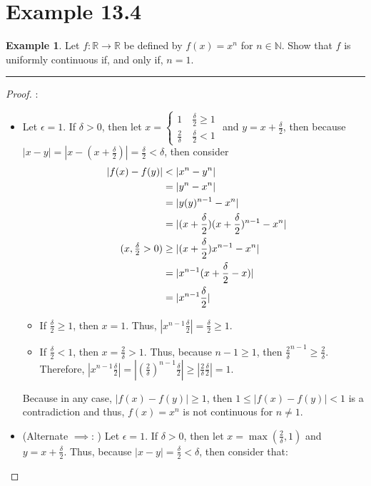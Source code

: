 \documentclass[openany, amssymb, psamsfonts]{amsart}
\newcommand{\bbN}{\mathbb{N}}
\newcommand{\bbR}{\mathbb{R}}
\theoremstyle{definition}
\newtheorem{exmp}{Example}[section]
\numberwithin{equation}{section}
\begin{document}
\section*{Example 13.4}
\begin{exmp}
\label{13.4}
	Let $f\colon \bbR \to \bbR$ be defined by $f(x) = x^n$ for $n \in \bbN$. Show that $f$ is uniformly continuous if, and only if, $n = 1$.
\end{exmp}
\vspace{4pt}     \hrule   \vspace{4pt} \begin{proof}:\\
\begin{itemize}
\item Let $\epsilon = 1$. If $\delta>0$, then let $x = \begin{cases}  1 \quad \frac{\delta}{2}\geq 1\\
\frac{2}{\delta} \quad \frac{\delta}{2} < 1
\end{cases}$ and $y= x + \frac{\delta}{2}$, then because $|x-y| = |x - (x + \frac{\delta}{2})| = \frac{\delta}{2}<\delta$, then consider 
\begin{align*}
|f(x) - f(y)| &< |x^n - y^n|\\
 &= |y^n - x^n|\\
 &= |y(y)^{n-1} - x^n|\\
 &= |(x+\frac{\delta}{2})(x+\frac{\delta}{2})^{n-1} - x^n| \\
\tag{$x,\frac{\delta}{2}>0$} &\geq|(x+\frac{\delta}{2})x^{n-1} - x^n|\\
&= |x^{n-1}(x+\frac{\delta}{2} - x)|\\
&= |x^{n-1}\frac{\delta}{2}|
\end{align*}
\begin{itemize}
    \item If $\frac{\delta}{2} \geq 1$, then $x = 1$. Thus, $|x^{n-1}\frac{\delta}{2}| = \frac{\delta}{2}\geq 1$.
    \item If $\frac{\delta}{2}< 1$, then $x=\frac{2}{\delta}>1$. Thus, because $n-1 \geq 1$, then $\frac{2}{\delta}^{n-1}\geq \frac{2}{\delta}$. Therefore, $|x^{n-1}\frac{\delta}{2}| = |(\frac{2}{\delta})^{n-1}\frac{\delta}{2}|\geq |\frac{2}{\delta} \frac{\delta}{2}| = 1$.
    \end{itemize}
Because in any case, $|f(x) - f(y)| \geq 1$, then $1\leq |f(x) - f(y)|< 1$ is a contradiction and thus, $f(x) = x^n$ is not continuous for $n\neq 1$.
\item (Alternate $\implies$: ) Let $\epsilon =1$. If $\delta>0$, then let $x = \max({\frac{2}{\delta}, 1})$ and $y = x+\frac{\delta}{2}$. Thus, because $|x-y|  = \frac{\delta}{2}<\delta$, then consider that:

\end{itemize}
\end{proof}
\end{document}
